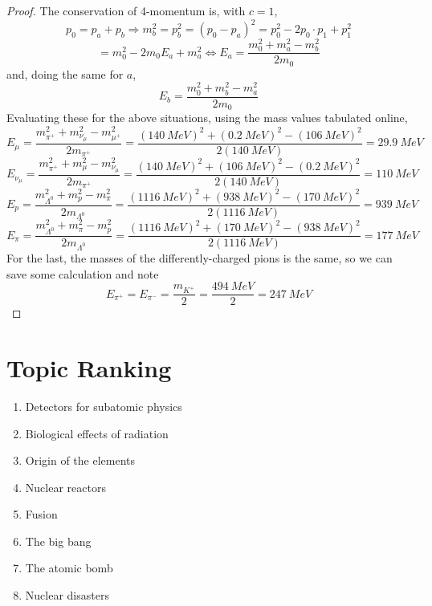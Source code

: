 \documentclass{article}
\begin{document}
\begin{proof}
  The conservation of 4-momentum is, with $c = 1$,
  \[
    p_{0} = p_{a} + p_{b}
    \Rightarrow m_{b}^{2} = p_{b}^{2} = (p_{0} - p_{a})^{2} = p_{0}^{2} - 2p_{0} \cdot p_{1} + p_{1}^{2}
  \]
  \[
    = m_{0}^{2} - 2m_{0}E_{a} + m_{a}^{2} \Leftrightarrow E_{a} = \frac{m_{0}^{2} + m_{a}^{2} -  m_{b}^{2}}{2m_{0}}
  \]
  and, doing the same for $a$,
  \[
    E_{b} = \frac{m_{0}^{2} + m_{b}^{2} -  m_{a}^{2}}{2m_{0}}
  \]
  Evaluating these for the above situations, using the mass values tabulated online,
  \[
    E_{\mu} = \frac{m_{\pi^{+}}^{2} + m_{\nu_{\mu}}^{2} - m_{\mu^{+}}^{2}}{2m_{\pi^{+}}}
    = \frac{(\SI{140}{MeV})^{2} + (\SI{0.2}{MeV})^{2} - (\SI{106}{MeV})^{2}}{2(\SI{140}{MeV})}
    = \SI{29.9}{MeV}
  \]
  \[
    E_{\nu_{\mu}} = \frac{m_{\pi^{+}}^{2} + m_{{\mu}}^{2} - m_{\nu_{\mu}}^{2}}{2m_{\pi^{+}}}
    = \frac{(\SI{140}{MeV})^{2} + (\SI{106}{MeV})^{2} - (\SI{0.2}{MeV})^{2}}{2(\SI{140}{MeV})}
    = \SI{110}{MeV}
  \]
  \[
    E_{p} = \frac{m_{\Lambda^{0}}^{2} + m_{p}^{2} - m_{\pi}^{2}}{2m_{\Lambda^{0}}}
    = \frac{(\SI{1116}{MeV})^{2} + (\SI{938}{MeV})^{2} - (\SI{170}{MeV})^{2}}{2(\SI{1116}{MeV})}
    = \SI{939}{MeV}
  \]
  \[
    E_{\pi} = \frac{m_{\Lambda^{0}}^{2} + m_{\pi}^{2} - m_{p}^{2}}{2m_{\Lambda^{0}}}
    = \frac{(\SI{1116}{MeV})^{2} + (\SI{170}{MeV})^{2} - (\SI{938}{MeV})^{2}}{2(\SI{1116}{MeV})}
    = \SI{177}{MeV}
  \]
  For the last, the masses of the differently-charged pions is the same, so we can save some calculation and note
  \[
    E_{\pi^{+}} = E_{\pi^{-}} = \frac{m_{K^{+}}}{2} = \frac{\SI{494}{MeV}}{2} = \SI{247}{MeV}
  \]

\end{proof}

\section*{Topic Ranking}

\begin{enumerate}
\item Detectors for subatomic physics
\item Biological effects of radiation
\item Origin of the elements
\item Nuclear reactors
\item Fusion
\item The big bang
\item The atomic bomb
\item Nuclear disasters
\end{enumerate}
\end{document}
